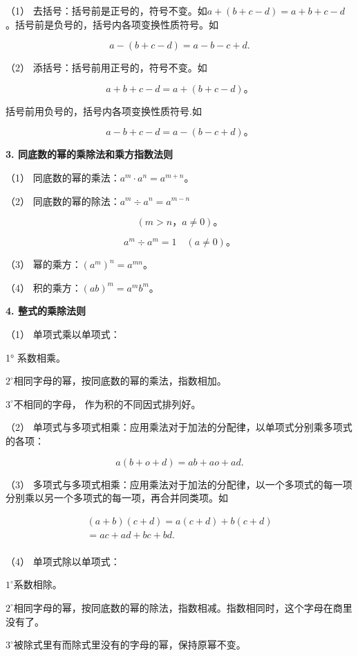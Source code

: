 （1）
去括号：括号前是正号的，符号不变。如\(a + (b + c - d) = a + b + c - d\)。括号前是负号的，括号内各项变换性质符号。如

\[
a - (b + c - d) = a - b - c + d.
\]

（2） 添括号：括号前用正号的，符号不变。如

\[
a + b + c - d = a + (b + c - d)\text{。}
\]

括号前用负号的，括号内各项变换性质符号.如

\[
a - b + c - d = a - (b - c + d)\text{。}
\]

\textbf{3. 同底数的幂的乘除法和乘方指数法则}

（1） 同底数的幂的乘法：\(a^{m} \cdot a^{n} = a^{m+n}\)。

（2） 同底数的幂的除法：\(a^m \div a^n = a^{m-n}\)

\[
(m > n\text{，} a \neq 0)\text{。}
\]

\[
a ^{m} \div a ^{m} = 1 \quad (a \neq 0)\text{。}
\]

（3） 幂的乘方：\((a^{m})^{n} = a^{mn}\)。

（4） 积的乘方：\((ab)^{m} = a^{m}b^{m}\)。

\textbf{4. 整式的乘除法则}

（1） 单项式乘以单项式：

1° 系数相乘。

\(2^{\circ}\)相同字母的幂，按同底数的幂的乘法，指数相加。

\(3^{\circ}\)不相同的字母， 作为积的不同因式排列好。

（2）
单项式与多项式相乘：应用乘法对于加法的分配律，以单项式分别乘多项式的各项：

\[
a (b + o + d) = a b + a o + a d.
\]

（3）
多项式与多项式相乘：应用乘法对于加法的分配律，以一个多项式的每一项分别乘以另一个多项式的每一项，再合并同类项。如

\[
\begin{array}{l} (a + b) (c + d) = a (c + d) + b (c + d) \\ = a c + a d + b c + b d. \\ \end{array}
\]

（4） 单项式除以单项式：

\(1^{\circ}\)系数相除。

\(2^{\circ}\)相同字母的幂，按同底数的幂的除法，指数相减。指数相同时，这个字母在商里没有了。

\(3^{\circ}\)被除式里有而除式里没有的字母的幂，保持原幂不变。

